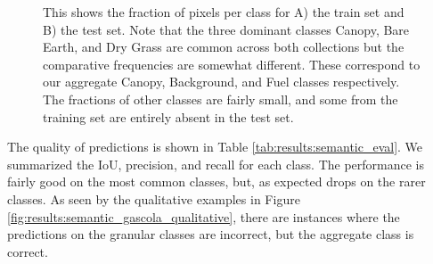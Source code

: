 \begin{figure}[h!]
   \centering
   \caption{This shows the fraction of pixels per class for A) the train set and B) the test set. Note that the three dominant classes Canopy, Bare Earth, and Dry Grass are common across both collections but the comparative frequencies are somewhat different. These correspond to our aggregate Canopy, Background, and Fuel classes respectively. The fractions of other classes are fairly small, and some from the training set are entirely absent in the test set.}
   \label{fig:results:semantic_class_fracs}                %
\end{figure}

The quality of predictions is shown in Table \ref{tab:results:semantic_eval}.  We summarized the IoU, precision, and recall for each class. The performance is fairly good on the most common classes, but, as expected drops on the rarer classes. As seen by the qualitative examples in Figure \ref{fig:results:semantic_gascola_qualitative}, there are instances where the predictions on the granular classes are incorrect, but the aggregate class is correct.

